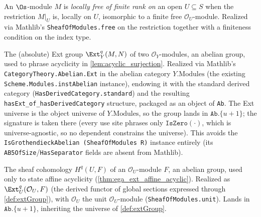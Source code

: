 \begin{definition}
  \label{def:isLocallyFreeOfFiniteRankOn}
  An $\Os$-module $M$ is \emph{locally free of finite rank on} an open
  $U \subseteq S$ when the restriction $M|_U$ is, locally on $U$, isomorphic to a
  finite free $\mathcal{O}_U$-module. Realized via Mathlib's
  \texttt{SheafOfModules.free} on the restriction together with a finiteness
  condition on the index type.
\end{definition}

\begin{definition}\leanok
  \label{def:extGroup}
  The (absolute) Ext group $\Ext^q_Y(M,N)$ of two $\mathcal{O}_Y$-modules, an
  abelian group, used to phrase acyclicity in \cref{lem:acyclic_surjection}.
  Realized via Mathlib's \texttt{CategoryTheory.Abelian.Ext} in the abelian
  category $Y.\mathrm{Modules}$ (the existing \texttt{Scheme.Modules.instAbelian}
  instance), endowing it with the standard derived category
  (\texttt{HasDerivedCategory.standard}) and the resulting
  \texttt{hasExt\_of\_hasDerivedCategory} structure, packaged as an object of
  \texttt{Ab}. The Ext universe is the object universe of $Y.\mathrm{Modules}$,
  so the group lands in $\mathtt{Ab}.\{u{+}1\}$; the signature is taken there
  (every use site phrases only $\mathtt{IsZero}(\cdot)$, which is
  universe-agnostic, so no dependent constrains the universe). This avoids the
  \texttt{IsGrothendieckAbelian (SheafOfModules R)} instance entirely (its
  \texttt{AB5OfSize}/\texttt{HasSeparator} fields are absent from Mathlib).
\end{definition}

\begin{definition}\leanok
  \label{def:sheafCohomology}
  The sheaf cohomology $H^q(U,F)$ of an $\mathcal{O}_U$-module $F$, an abelian
  group, used only to state affine acyclicity (\cref{thm:ega_ext_affine_acyclic}).
  Realized as $\Ext^q_U(\mathcal{O}_U, F)$ (the derived functor of global sections
  expressed through \cref{def:extGroup}), with $\mathcal{O}_U$ the unit
  $\mathcal{O}_U$-module (\texttt{SheafOfModules.unit}). Lands in
  $\mathtt{Ab}.\{u{+}1\}$, inheriting the universe of \cref{def:extGroup}.
\end{definition}

